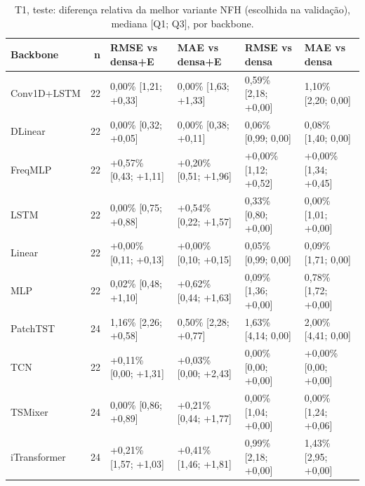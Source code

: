 \begin{table}[htbp]
\centering
\scriptsize
\setlength{\tabcolsep}{2pt}
\caption{T1, teste: diferen\c{c}a relativa da melhor variante NFH (escolhida na valida\c{c}\~ao), mediana [Q1; Q3], por backbone.}\label{tab:t1_bb_test}
\begin{tabular}{lrllll}
\toprule
Backbone & n & \shortstack[l]{RMSE vs\\ densa+E} & \shortstack[l]{MAE vs\\ densa+E} & \shortstack[l]{RMSE vs\\ densa} & \shortstack[l]{MAE vs\\ densa} \\ \midrule
Conv1D+LSTM & 22 & \textminus{}0,00\% [\textminus{}1,21; +0,33] & \textminus{}0,00\% [\textminus{}1,63; +1,33] & \textminus{}0,59\% [\textminus{}2,18; +0,00] & \textminus{}1,10\% [\textminus{}2,20; \textminus{}0,00] \\
DLinear & 22 & \textminus{}0,00\% [\textminus{}0,32; +0,05] & \textminus{}0,00\% [\textminus{}0,38; +0,11] & \textminus{}0,06\% [\textminus{}0,99; \textminus{}0,00] & \textminus{}0,08\% [\textminus{}1,40; \textminus{}0,00] \\
FreqMLP & 22 & +0,57\% [\textminus{}0,43; +1,11] & +0,20\% [\textminus{}0,51; +1,96] & +0,00\% [\textminus{}1,12; +0,52] & +0,00\% [\textminus{}1,34; +0,45] \\
LSTM & 22 & \textminus{}0,00\% [\textminus{}0,75; +0,88] & +0,54\% [\textminus{}0,22; +1,57] & \textminus{}0,33\% [\textminus{}0,80; +0,00] & \textminus{}0,00\% [\textminus{}1,01; +0,00] \\
Linear & 22 & +0,00\% [\textminus{}0,11; +0,13] & +0,00\% [\textminus{}0,10; +0,15] & \textminus{}0,05\% [\textminus{}0,99; \textminus{}0,00] & \textminus{}0,09\% [\textminus{}1,71; \textminus{}0,00] \\
MLP & 22 & \textminus{}0,02\% [\textminus{}0,48; +1,10] & +0,62\% [\textminus{}0,44; +1,63] & \textminus{}0,09\% [\textminus{}1,36; +0,00] & \textminus{}0,78\% [\textminus{}1,72; +0,00] \\
PatchTST & 24 & \textminus{}1,16\% [\textminus{}2,26; +0,58] & \textminus{}0,50\% [\textminus{}2,28; +0,77] & \textminus{}1,63\% [\textminus{}4,14; \textminus{}0,00] & \textminus{}2,00\% [\textminus{}4,41; \textminus{}0,00] \\
TCN & 22 & +0,11\% [\textminus{}0,00; +1,31] & +0,03\% [\textminus{}0,00; +2,43] & \textminus{}0,00\% [\textminus{}0,00; +0,00] & +0,00\% [\textminus{}0,00; +0,00] \\
TSMixer & 24 & \textminus{}0,00\% [\textminus{}0,86; +0,89] & +0,21\% [\textminus{}0,44; +1,77] & \textminus{}0,00\% [\textminus{}1,04; +0,00] & \textminus{}0,00\% [\textminus{}1,24; +0,06] \\
iTransformer & 24 & +0,21\% [\textminus{}1,57; +1,03] & +0,41\% [\textminus{}1,46; +1,81] & \textminus{}0,99\% [\textminus{}2,18; +0,00] & \textminus{}1,43\% [\textminus{}2,95; +0,00] \\
\bottomrule
\end{tabular}
\par{}
\end{table}
